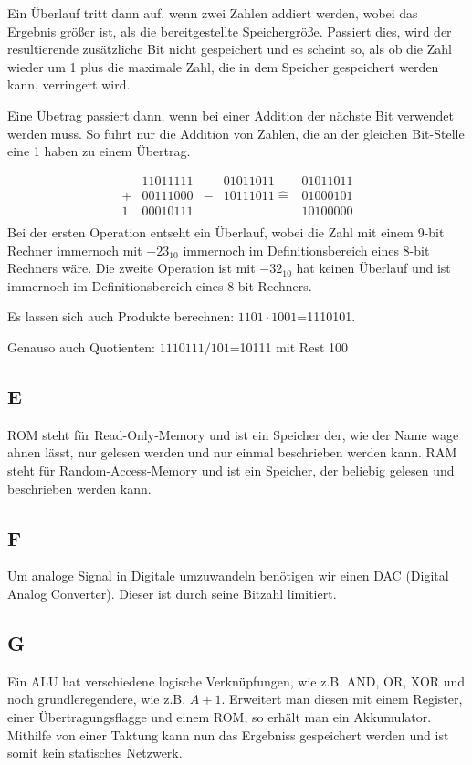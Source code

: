 \documentclass[10pt]{article}
\begin{document}
\begin{multicols}{2}
	Ein Überlauf tritt dann auf, wenn zwei Zahlen addiert werden, wobei das Ergebnis größer ist, als die bereitgestellte Speichergröße. Passiert dies, wird der resultierende zusätzliche Bit nicht gespeichert und es scheint so, als ob die Zahl wieder um 1 plus die maximale Zahl, die in dem Speicher gespeichert werden kann, verringert wird.

	Eine Übetrag passiert dann, wenn bei einer Addition der nächste Bit verwendet werden muss. So führt nur die Addition von Zahlen, die an der gleichen Bit-Stelle eine 1 haben zu einem Übertrag.

	\begin{align*}
		  & 11011111 &   & 01011011         & 01011011 \\
		+ & 00111000 & - & 10111011 \hat{=} & 01000101 \\
		\hline
		1 & 00010111 &   &                  & 10100000 \\
	\end{align*}
  Bei der ersten Operation entseht ein Überlauf, wobei die Zahl mit einem 9-bit Rechner immernoch mit $-23_{10}$ immernoch im Definitionsbereich eines 8-bit Rechners wäre. Die zweite Operation ist mit $-32_{10}$ hat keinen Überlauf und ist immernoch im Definitionsbereich eines 8-bit Rechners.

  Es lassen sich auch Produkte berechnen: $1101 \cdot 1001$=1110101.

  Genauso auch Quotienten: $1110111 / 101$=10111 mit Rest 100
  \subsection*{E}
  ROM steht für Read-Only-Memory und ist ein Speicher der, wie der Name wage ahnen lässt, nur gelesen werden und nur einmal beschrieben werden kann. RAM steht für Random-Access-Memory und ist ein Speicher, der beliebig gelesen und beschrieben werden kann.
  \subsection*{F}
  Um analoge Signal in Digitale umzuwandeln benötigen wir einen DAC (Digital Analog Converter). Dieser ist durch seine Bitzahl limitiert.
  \subsection*{G}
  Ein ALU hat verschiedene logische Verknüpfungen, wie z.B. AND, OR, XOR und noch grundleregendere, wie z.B. $A+1$. Erweitert man diesen mit einem Register, einer Übertragungsflagge und einem ROM, so erhält man ein Akkumulator. Mithilfe von einer Taktung kann nun das Ergebniss gespeichert werden und ist somit kein statisches Netzwerk.

\end{multicols}
\end{document}
